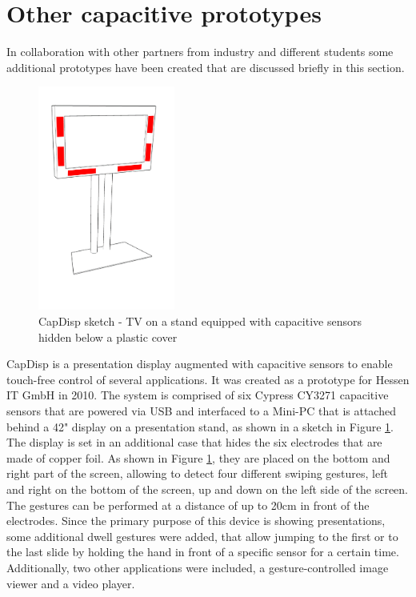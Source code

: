 \section{Other capacitive prototypes}
\label{ch:prot_otherprot}
In collaboration with other partners from industry and different students some additional prototypes have been created that are discussed briefly in this section. 

\begin{figure}[ht]
\centering
\includegraphics[width=0.4\textwidth]{images/other_proto_capdisp}
\caption{CapDisp sketch - TV on a stand equipped with capacitive sensors hidden below a plastic cover}
\label{fig:other_proto_capdisp}
\end{figure}

CapDisp is a presentation display augmented with capacitive sensors to enable touch-free control of several applications. It was created as a prototype for Hessen IT GmbH in 2010. The system is comprised of six Cypress CY3271 capacitive sensors that are powered via USB and interfaced to a Mini-PC that is attached behind a 42" display on a presentation stand, as shown in a sketch in Figure \ref{fig:other_proto_capdisp}. The display is set in an additional case that hides the six electrodes that are made of copper foil. As shown in Figure \ref{fig:other_proto_capdisp}, they are placed on the bottom and right part of the screen, allowing to detect four different swiping gestures, left and right on the bottom of the screen, up and down on the left side of the screen. The gestures can be performed at a distance of up to 20cm in front of the electrodes. Since the primary purpose of this device is showing presentations, some additional dwell gestures were added, that allow jumping to the first or to the last slide by holding the hand in front of a specific sensor for a certain time. Additionally, two other applications were included, a gesture-controlled image viewer and a video player.


